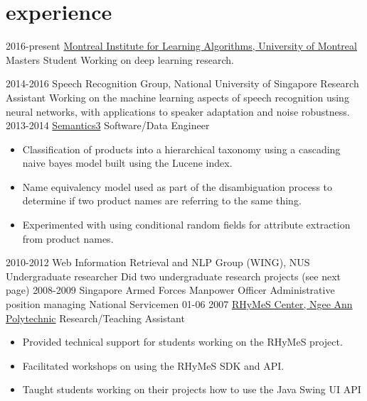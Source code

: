 \documentclass[]{friggeri-cv}
\begin{document}
\section{experience}

\begin{entrylist}
	\entry
	{2016-present}
	{\href{http://mila.umontreal.ca}{Montreal Institute for Learning Algorithms, 
	University of Montreal}}
	{Masters Student}
	{Working on deep learning research.}

	\entry
	{2014-2016}
	{Speech Recognition Group, National University of Singapore}
	{Research Assistant}
	{Working on the machine learning aspects of speech recognition using neural 
	networks, with applications to speaker adaptation and noise robustness.}
	\entry
	{2013-2014}
	{\href{http://semantics3.com}{Semantics3}}
	{Software/Data Engineer}
	{\begin{itemize}[itemsep=0pt,topsep=0pt]
			\item Classification of products into a hierarchical taxonomy using 
				a cascading naive bayes model built using the Lucene index.
			\item Name equivalency model used as part of the disambiguation 
				process to determine if two product names are referring to the 
				same thing.
			\item Experimented with using conditional random fields for 
				attribute extraction from product names.
		\end{itemize}
	}
	\entry
	{2010-2012}
	{Web Information Retrieval and NLP Group (WING), NUS}
	{Undergraduate researcher}
	{Did two undergraduate research projects (see next page)}
	\entry
	{2008-2009}
	{Singapore Armed Forces}
	{Manpower Officer}
	{Administrative position managing National Servicemen}
	\entry
	{01-06 2007}
	{\href{http://www.np.edu.sg/ict/facilities/rhymes/Pages/loc\_rhymes.aspx}{RHyMeS 
	Center, Ngee Ann Polytechnic}}
	{Research/Teaching Assistant}
	{
		\begin{itemize}[itemsep=0pt,topsep=0pt]
			\item Provided technical support for students working on the RHyMeS 
				project.
			\item Facilitated workshops on using the RHyMeS SDK and API.
			\item  Taught students working on their projects how to use the Java 
				Swing UI API
		\end{itemize}
	}
\end{entrylist}
\pagebreak
\end{document}
